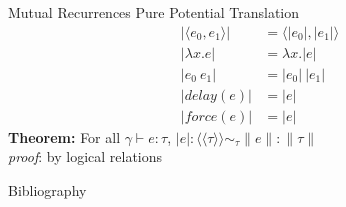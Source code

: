 \documentclass[pdf]{beamer}
\newcommand{\LP}{\langle}
\newcommand{\RP}{\rangle}
\newcommand{\LL}{\langle\!\langle}
\newcommand{\RR}{\rangle\!\rangle}
\begin{document}
\begin{frame}{Mutual Recurrences}
  \vfill
  Pure Potential Translation
    \begin{align*}
      |\LP e_0, e_1 \RP | &= \LP |e_0|, |e_1| \RP                                  \\
      |\lambda x.e | &= \lambda x.|e|                                                              \\
      |e_0\ e_1| &= |e_0|\ |e_1|                                                                   \\
      |delay(e)| &= |e|                                                                            \\
      |force(e)| &= |e|
    \end{align*}
  \vfill
  \textbf{Theorem:}
    For all $\gamma \vdash e : \tau$, $|e| : \LL \tau \RR \sim_\tau \|e\| : \|\tau\|$\\
  \textit{proof}: by logical relations
  \vfill
\end{frame}


\begin{frame}{Bibliography}
  
  
\end{frame}
\end{document}

